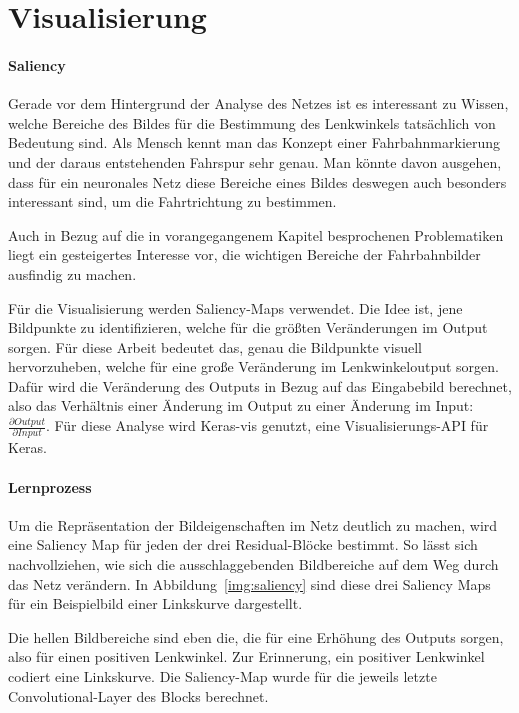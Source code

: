 \section{Visualisierung}

\paragraph{Saliency}
Gerade vor dem Hintergrund der Analyse des Netzes  ist es interessant zu Wissen, welche Bereiche des Bildes für die Bestimmung des Lenkwinkels tatsächlich von Bedeutung sind. Als Mensch kennt man das Konzept einer Fahrbahnmarkierung und der daraus entstehenden Fahrspur sehr genau. Man könnte davon ausgehen, dass für ein neuronales Netz diese Bereiche eines Bildes deswegen auch besonders interessant sind, um die Fahrtrichtung zu bestimmen.

Auch in Bezug auf die in vorangegangenem Kapitel besprochenen Problematiken liegt ein gesteigertes Interesse vor, die wichtigen Bereiche der Fahrbahnbilder ausfindig zu machen.

Für die Visualisierung werden Saliency-Maps  \cite{simonyan2013deep} verwendet. Die Idee ist, jene Bildpunkte zu identifizieren, welche für die größten Veränderungen im Output sorgen. Für diese Arbeit bedeutet das, genau die Bildpunkte visuell hervorzuheben, welche für eine große Veränderung im Lenkwinkeloutput sorgen. Dafür wird die Veränderung des Outputs in Bezug auf das Eingabebild berechnet, also das Verhältnis einer Änderung im Output zu einer Änderung im Input: $\frac{\partial Output}{\partial Input}$. Für diese Analyse wird Keras-vis  genutzt, eine Visualisierungs-API für Keras.

\paragraph{Lernprozess}
Um die Repräsentation der Bildeigenschaften im Netz deutlich zu machen, wird eine Saliency Map für jeden der drei Residual-Blöcke bestimmt. So lässt sich nachvollziehen, wie sich die ausschlaggebenden Bildbereiche auf dem Weg durch das Netz verändern. In Abbildung~\ref{img:saliency} sind diese drei Saliency Maps für ein Beispielbild einer Linkskurve dargestellt.

Die hellen Bildbereiche sind eben die, die für eine Erhöhung des Outputs sorgen, also für einen positiven Lenkwinkel. Zur Erinnerung, ein positiver Lenkwinkel codiert eine Linkskurve. Die Saliency-Map wurde für die jeweils letzte Convolutional-Layer des Blocks berechnet.

